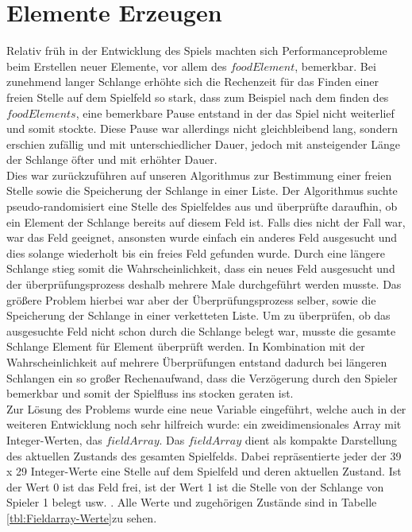 \section{Elemente Erzeugen}
\label{Elemente Erzeugen}
Relativ fr{\"u}h in der Entwicklung des Spiels machten sich Performanceprobleme beim Erstellen neuer Elemente, vor allem des $foodElement$, bemerkbar. Bei zunehmend langer Schlange erh{\"o}hte sich die Rechenzeit f{\"u}r das Finden einer freien Stelle auf dem Spielfeld so stark, dass zum Beispiel nach dem finden des $foodElements$, eine bemerkbare Pause entstand in der das Spiel nicht weiterlief und somit stockte. Diese Pause war allerdings nicht gleichbleibend lang, sondern erschien zuf{\"a}llig und mit unterschiedlicher Dauer, jedoch mit ansteigender L{\"a}nge der Schlange {\"o}fter und mit erhöhter Dauer.\\
Dies war zur{\"u}ckzuf{\"u}hren auf unseren Algorithmus zur Bestimmung einer freien Stelle sowie die Speicherung der Schlange in einer Liste. Der Algorithmus suchte pseudo-randomisiert eine Stelle des Spielfeldes aus und {\"u}berpr{\"u}fte daraufhin, ob ein Element der Schlange bereits auf diesem Feld ist. Falls dies nicht der Fall war, war das Feld geeignet, ansonsten wurde einfach ein anderes Feld ausgesucht und dies solange wiederholt bis ein freies Feld gefunden wurde. Durch eine l{\"a}ngere Schlange stieg somit die Wahrscheinlichkeit, dass ein neues Feld ausgesucht und der {\"u}berpr{\"u}fungsprozess deshalb mehrere Male durchgef{\"u}hrt werden musste. Das gr{\"o}ßere Problem hierbei war aber der {\"U}berpr{\"u}fungsprozess selber, sowie die Speicherung der Schlange in einer verketteten Liste. Um zu {\"u}berpr{\"u}fen, ob das ausgesuchte Feld nicht schon durch die Schlange belegt war, musste die gesamte Schlange Element f{\"u}r Element {\"u}berpr{\"u}ft werden. In Kombination mit der Wahrscheinlichkeit auf mehrere {\"U}berpr{\"u}fungen entstand dadurch bei l{\"a}ngeren Schlangen ein so großer Rechenaufwand, dass die  Verz{\"o}gerung durch den Spieler bemerkbar und somit der Spielfluss ins stocken geraten ist.\\
Zur L{\"o}sung des Problems wurde eine neue Variable eingef{\"u}hrt, welche auch in der weiteren Entwicklung noch sehr hilfreich wurde: ein zweidimensionales Array mit Integer-Werten, das $fieldArray$. Das $fieldArray$ dient als kompakte Darstellung des aktuellen Zustands des gesamten Spielfelds. Dabei repr{\"a}sentierte jeder der 39 x 29 Integer-Werte eine Stelle auf dem Spielfeld und deren aktuellen Zustand. Ist der Wert 0 ist das Feld frei, ist der Wert 1 ist die Stelle von der Schlange von Spieler 1 belegt usw. . Alle Werte und zugeh{\"o}rigen Zust{\"a}nde sind in Tabelle \ref{tbl:Fieldarray-Werte}zu sehen.
